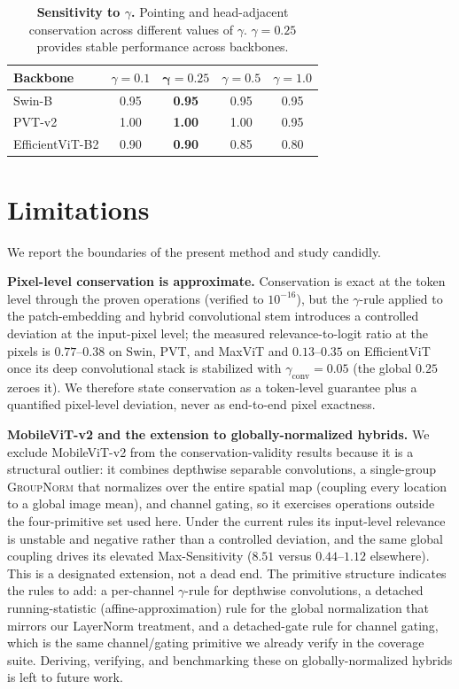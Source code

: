 \documentclass[lettersize,journal]{IEEEtran}
\begin{document}
\begin{table}[h]
  \centering
  \caption{\textbf{Sensitivity to $\gamma$.} Pointing and head-adjacent conservation across different values of $\gamma$. $\gamma{=}0.25$ provides stable performance across backbones.}
  \label{tab:gamma}
  \setlength{\tabcolsep}{5pt}
  \begin{tabular}{l cccc}
    \toprule
    Backbone & $\gamma{=}0.1$ & $\bm{\gamma{=}0.25}$ & $\gamma{=}0.5$ & $\gamma{=}1.0$ \\
    \midrule
    Swin-B          & 0.95 & \textbf{0.95} & 0.95 & 0.95 \\
    PVT-v2          & 1.00 & \textbf{1.00} & 1.00 & 0.95 \\
    EfficientViT-B2 & 0.90 & \textbf{0.90} & 0.85 & 0.80 \\
    \bottomrule
  \end{tabular}
\end{table}

\section{Limitations}
\label{sec:limitations}
We report the boundaries of the present method and study candidly.

\textbf{Pixel-level conservation is approximate.} Conservation is exact at the token level through the proven operations (verified to $10^{-16}$), but the $\gamma$-rule applied to the patch-embedding and hybrid convolutional stem introduces a controlled deviation at the input-pixel level; the measured relevance-to-logit ratio at the pixels is $0.77$--$0.38$ on Swin, PVT, and MaxViT and $0.13$--$0.35$ on EfficientViT once its deep convolutional stack is stabilized with $\gamma_{\text{conv}}{=}0.05$ (the global $0.25$ zeroes it). We therefore state conservation as a token-level guarantee plus a quantified pixel-level deviation, never as end-to-end pixel exactness.

\textbf{MobileViT-v2 and the extension to globally-normalized hybrids.} We exclude MobileViT-v2 from the conservation-validity results because it is a structural outlier: it combines depthwise separable convolutions, a single-group \textsc{GroupNorm} that normalizes over the entire spatial map (coupling every location to a global image mean), and channel gating, so it exercises operations outside the four-primitive set used here. Under the current rules its input-level relevance is unstable and negative rather than a controlled deviation, and the same global coupling drives its elevated Max-Sensitivity ($8.51$ versus $0.44$--$1.12$ elsewhere). This is a designated extension, not a dead end. The primitive structure indicates the rules to add: a per-channel $\gamma$-rule for depthwise convolutions, a detached running-statistic (affine-approximation) rule for the global normalization that mirrors our LayerNorm treatment, and a detached-gate rule for channel gating, which is the same channel/gating primitive we already verify in the coverage suite. Deriving, verifying, and benchmarking these on globally-normalized hybrids is left to future work.
\end{document}
